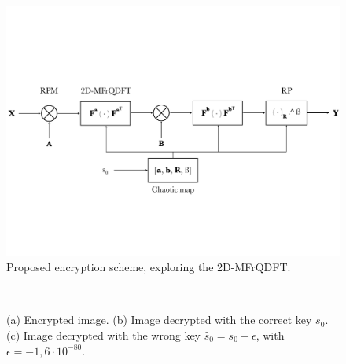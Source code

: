 \begin{figure}
\centering
\includegraphics[width=0.9\linewidth]{Figures/esquema_EN.pdf}
\caption{Proposed encryption scheme, exploring the 2D-MFrQDFT.}
\label{fig:cifragem}
\end{figure}

\begin{figure}
\centering
{}~
~
~
\caption{(a) Encrypted image. (b) Image decrypted with the correct key $ s_0 $. (c) Image decrypted with the wrong key $ \widetilde{s_0} = s_0 + \epsilon $, with $ \epsilon = -1{,}6 \cdot 10^{-80} $.}
\end{figure}

